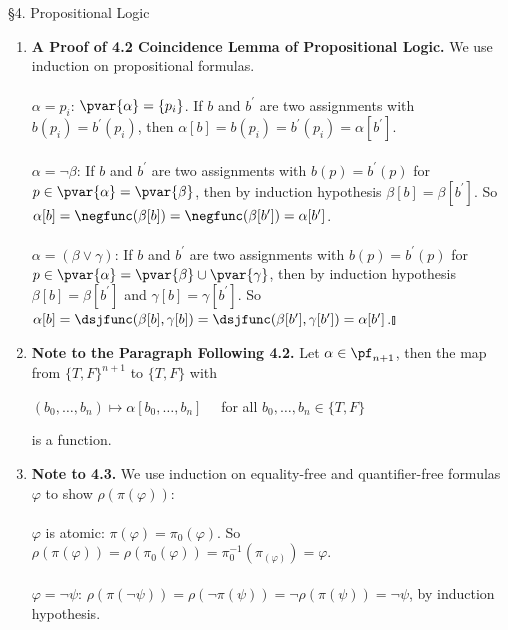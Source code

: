 \
\\
\\
{\large \S4. Propositional Logic}
\begin{enumerate}[1.]
\item \textbf{A Proof of 4.2 Coincidence Lemma of Propositional Logic.} We use induction on propositional formulas.\\
\ \\
$\alpha = p_i$: $\pvar{\alpha} = \{ p_i \}$. If $b$ and $b^\prime$ are two assignments with $b(p_i) = b^\prime(p_i)$, then $\alpha[b] = b(p_i) = b^\prime(p_i) = \alpha[b^\prime]$.\\
\ \\
$\alpha = \neg \beta$: If $b$ and $b^\prime$ are two assignments with $b(p) = b^\prime(p)$ for $p \in \pvar{\alpha} = \pvar{\beta}$, then by induction hypothesis $\beta[b] = \beta[b^\prime]$. So $\alpha[b] = \negfunc (\beta[b]) = \negfunc (\beta[b^\prime]) = \alpha[b^\prime]$.\\
\ \\
$\alpha = (\beta \lor \gamma)$: If $b$ and $b^\prime$ are two assignments with $b(p) = b^\prime(p)$ for $p \in \pvar{\alpha} = \pvar{\beta} \cup \pvar{\gamma}$, then by induction hypothesis $\beta[b] = \beta[b^\prime]$ and $\gamma[b] = \gamma[b^\prime]$. So $\alpha[b] = \dsjfunc (\beta[b], \gamma[b]) = \dsjfunc (\beta[b^\prime], \gamma[b^\prime]) = \alpha[b^\prime]$.\nolinebreak\hfill$\talloblong$
%
\item \textbf{Note to the Paragraph Following 4.2.} Let $\alpha \in \pf_{n + 1}$, then the map from $\{ T, F \}^{n + 1}$ to $\{ T, F \}$ with
\begin{center}
$(b_0, \ldots, b_n) \mapsto \alpha[b_0, \ldots, b_n]$ \ \ for all $b_0, \ldots, b_n \in \{ T, F \}$
\end{center} 
is a function.
%
\item \textbf{Note to 4.3.} We use induction on equality-free and quantifier-free formulas $\varphi$ to show $\rho ( \pi ( \varphi ) )$:\\
\ \\
$\varphi$ is atomic: $\pi ( \varphi ) = \pi_0 ( \varphi )$. So $\rho ( \pi ( \varphi ) ) = \rho ( \pi_0 ( \varphi ) ) = \pi_0^{-1} ( \pi_ ( \varphi ) ) = \varphi$.\\
\ \\
$\varphi = \neg\psi$: $\rho ( \pi ( \neg\psi ) ) = \rho ( \neg \pi ( \psi ) ) = \neg \rho ( \pi ( \psi ) ) = \neg\psi$, by induction hypothesis.\\

\end{enumerate}
